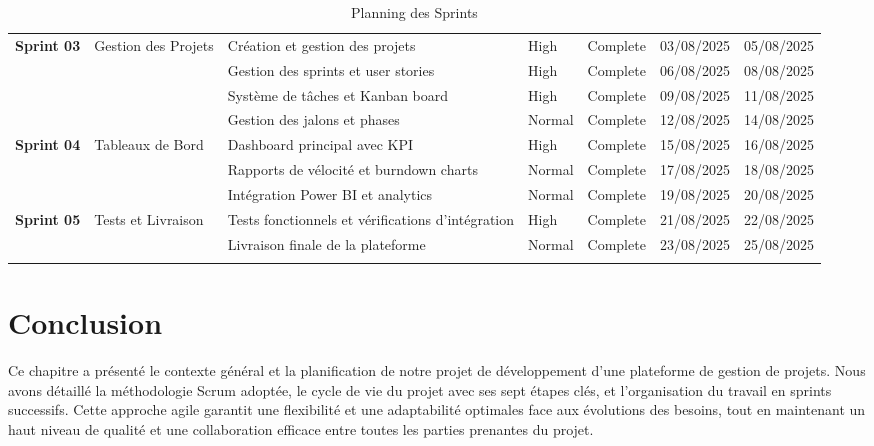 \begin{longtable}{|p{1.2cm}|p{2.8cm}|p{4.8cm}|p{1.2cm}|p{1.2cm}|p{1.8cm}|p{1.8cm}|}
    \multirow{4}{=}{\centering\textbf{Sprint 03}} & \multirow{4}{=}{\centering Gestion des Projets} & Création et gestion des projets & High & Complete & 03/08/2025 & 05/08/2025 \\ \cline{3-7}
    & & Gestion des sprints et user stories & High & Complete & 06/08/2025 & 08/08/2025 \\ \cline{3-7}
    & & Système de tâches et Kanban board & High & Complete & 09/08/2025 & 11/08/2025 \\ \cline{3-7}
    & & Gestion des jalons et phases & Normal & Complete & 12/08/2025 & 14/08/2025 \\ \hline

    \multirow{3}{=}{\centering\textbf{Sprint 04}} & \multirow{3}{=}{\centering Tableaux de Bord} & Dashboard principal avec KPI & High & Complete & 15/08/2025 & 16/08/2025 \\ \cline{3-7}
    & & Rapports de vélocité et burndown charts & Normal & Complete & 17/08/2025 & 18/08/2025 \\ \cline{3-7}
    & & Intégration Power BI et analytics & Normal & Complete & 19/08/2025 & 20/08/2025 \\ \hline

    \multirow{2}{=}{\centering\textbf{Sprint 05}} & \multirow{2}{=}{\centering Tests et Livraison} & Tests fonctionnels et vérifications d'intégration & High & Complete & 21/08/2025 & 22/08/2025 \\ \cline{3-7}
& & Livraison finale de la plateforme & Normal & Complete & 23/08/2025 & 25/08/2025 \\ \hline

\caption{Planning des Sprints}
\label{tab:planning_sprints}
\endlastfoot

\end{longtable}
\endgroup

\section{Conclusion}

Ce chapitre a présenté le contexte général et la planification de notre projet de développement d'une plateforme de gestion de projets. Nous avons détaillé la méthodologie Scrum adoptée, le cycle de vie du projet avec ses sept étapes clés, et l'organisation du travail en sprints successifs. Cette approche agile garantit une flexibilité et une adaptabilité optimales face aux évolutions des besoins, tout en maintenant un haut niveau de qualité et une collaboration efficace entre toutes les parties prenantes du projet.